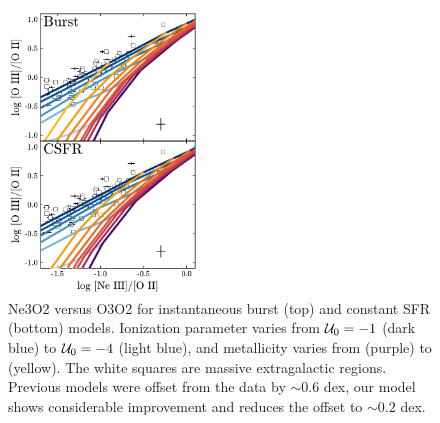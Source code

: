 \begin{figure}[!htbp]
  \begin{centering}
    \includegraphics[width=0.45\textwidth]{manuscript/chapter2/f20.pdf}
    \caption{Ne3O2 versus O3O2 for instantaneous burst (top) and constant SFR (bottom) models. Ionization parameter varies from $\mathcal{U}_{0}=-1$ (dark blue) to $\mathcal{U}_{0}=-4$ (light blue), and metallicity varies from  (purple) to  (yellow). The white squares are massive extragalactic \hii regions. Previous models were offset from the data by $\sim 0.6$ dex, our model shows considerable improvement and reduces the offset to $\sim 0.2$ dex.}
    \label{fig:NeIII}
  \end{centering}
\end{figure}

